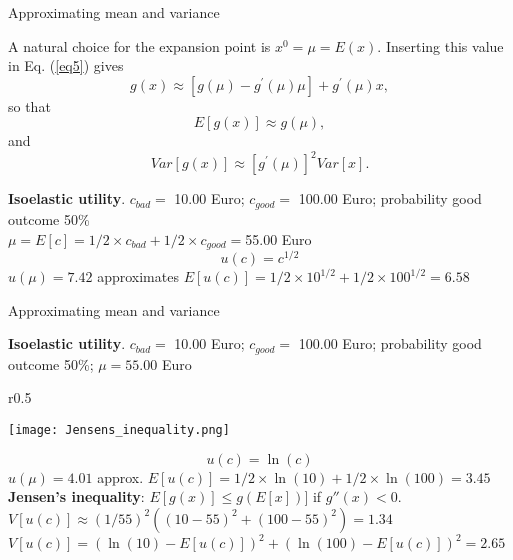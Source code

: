 \documentclass[11pt,table]{beamer}
\begin{document}
\begin{frame}{Approximating mean and variance}

A natural choice for the expansion point is $x^{0} = \mu = E(x)$. Inserting this value in Eq. (\ref{eq5}) gives
\begin{equation}\label{eq6}
    g(x)\approx [g(\mu)-g^{\prime}(\mu)\mu]+g^{\prime}(\mu)x,
\end{equation}
so that
\begin{equation}\label{eq7}
    E[g(x)] \approx g(\mu),
\end{equation}
and
\begin{equation}\label{eq8}
    Var[g(x)]\approx [g^{\prime}(\mu)]^{2} Var[x].
\end{equation}
\scriptsize
\begin{example} \textbf{Isoelastic utility}.
$c_{bad}=$	10.00 Euro; $c_{good}=$	100.00 Euro;  probability good outcome	50\%\\[2ex]
$\mu=E[c]=1/2 \times c_{bad}+ 1/2 \times c_{good}=$55.00 Euro\\
$$u(c)= c^{1/2}$$
$u(\mu)= 7.42$ approximates $E[u(c)]= 1/2\times10^{1/2}+1/2\times100^{1/2}=6.58$
\end{example}

\end{frame}


\begin{frame}{Approximating mean and variance}

\small

\begin{example} \textbf{Isoelastic utility}.
\footnotesize
$c_{bad}=$	10.00 Euro; $c_{good}=$	100.00 Euro;  probability good outcome	50\%; $\mu=55.00$ Euro\\[2ex]

\begin{wrapfigure}{r}{0.5\textwidth}
  \vspace{-20pt}
  \begin{center}
		\texttt{[image: Jensens\_inequality.png]}
	\label{fig:Jensens_inequality}
  \vspace{-40pt}
  \end{center}
\end{wrapfigure}

$$u(c)= \ln(c)$$
$u(\mu)= 4.01$ approx. $E[u(c)]= 1/2\times \ln(10)+1/2\times \ln(100)=3.45$\\[8ex]

\textbf{Jensen's inequality}: $E[g(x)]\leq g(E[x])]$ if $g''(x)<0$.\\[10ex]

$V[u(c)]\approx (1/55)^{2}((10-55)^2+(100-55)^2) =1.34$\\
$V[u(c)]= (\ln(10)-E[u(c)])^2+(\ln(100)-E[u(c)])^2 =2.65$
\end{example}

\end{frame}
\end{document}

